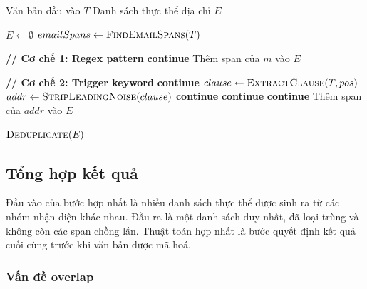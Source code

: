 \begin{algorithm}[H]
    \caption{Thuật toán nhận diện địa chỉ}
    \label{alg:detect_address}
    \begin{algorithmic}[1]
        \Require Văn bản đầu vào $T$
        \Ensure Danh sách thực thể địa chỉ $E$

        \State $E \leftarrow \emptyset$
        \State $emailSpans \leftarrow \textsc{FindEmailSpans}(T)$

        \Statex \hspace{-\algorithmicindent}\textbf{// Cơ chế 1: Regex pattern}
         \textbf{continue} \EndIf
        \State Thêm span của $m$ vào $E$
        \EndFor

        \Statex \hspace{-\algorithmicindent}\textbf{// Cơ chế 2: Trigger keyword}
         \textbf{continue} \EndIf
        \State $clause \leftarrow \textsc{ExtractClause}(T, pos)$
        \State $addr \leftarrow \textsc{StripLeadingNoise}(clause)$
         \textbf{continue} \EndIf
         \textbf{continue} \EndIf
         \textbf{continue} \EndIf
        \State Thêm span của $addr$ vào $E$
        \EndFor
        \EndFor

        \State \Return $\textsc{Deduplicate}(E)$
    \end{algorithmic}
\end{algorithm}

\subsection{Tổng hợp kết quả}

Đầu vào của bước hợp nhất là nhiều danh sách thực thể được sinh ra từ các nhóm
nhận diện khác nhau. Đầu ra là một danh sách duy nhất, đã loại trùng và không
còn các span chồng lấn. Thuật toán hợp nhất là bước quyết định kết quả cuối
cùng trước khi văn bản được mã hoá.

\subsubsection{Vấn đề overlap}

